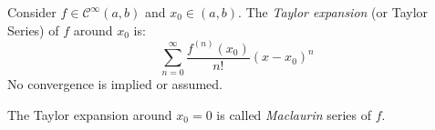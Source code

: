 \begin{definition}
    Consider $f \in \mathcal{C}^\infty(a,b)$ and $x_0 \in (a,b)$. The \emph{Taylor expansion} (or Taylor Series) of $f$ around $x_0$ is:
    \begin{equation*}
        \sum \limits_{n=0}^\infty \frac{f^{(n)}(x_0)}{n!}(x - x_0)^n
    \end{equation*}
    No convergence is implied or assumed.
\end{definition}

\begin{remark}
    The Taylor expansion around $x_0 = 0$ is called \emph{Maclaurin} series of $f$.
\end{remark}